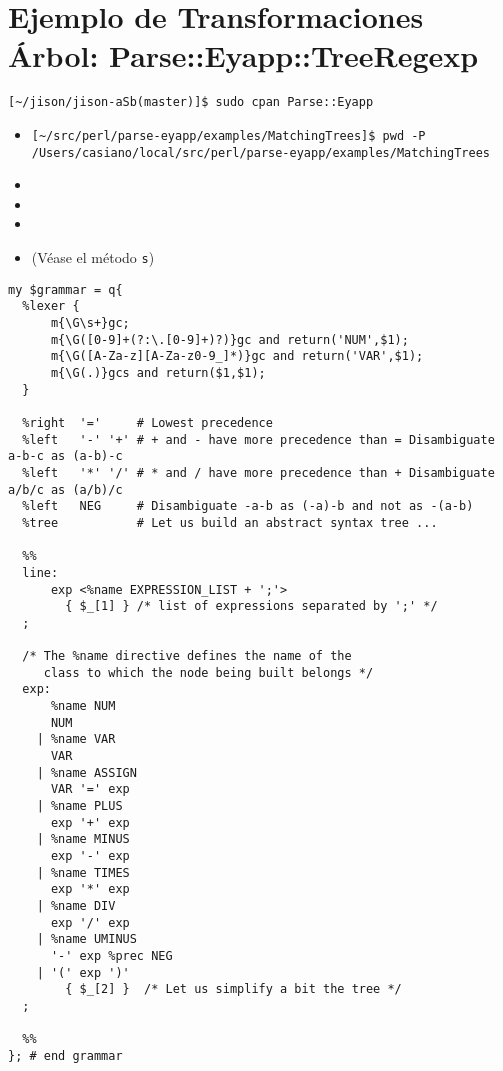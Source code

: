 \section{Ejemplo de Transformaciones Árbol: Parse::Eyapp::TreeRegexp}


\begin{verbatim}
[~/jison/jison-aSb(master)]$ sudo cpan Parse::Eyapp
\end{verbatim}


\begin{itemize}
\item
\begin{verbatim}
[~/src/perl/parse-eyapp/examples/MatchingTrees]$ pwd -P
/Users/casiano/local/src/perl/parse-eyapp/examples/MatchingTrees
\end{verbatim}
\item
{}
\item
{}
\item
{}
\item
{} (Véase el método \verb|s|)
\end{itemize}


\begin{verbatim}
my $grammar = q{
  %lexer {
      m{\G\s+}gc;
      m{\G([0-9]+(?:\.[0-9]+)?)}gc and return('NUM',$1);
      m{\G([A-Za-z][A-Za-z0-9_]*)}gc and return('VAR',$1);
      m{\G(.)}gcs and return($1,$1);
  }

  %right  '='     # Lowest precedence
  %left   '-' '+' # + and - have more precedence than = Disambiguate a-b-c as (a-b)-c
  %left   '*' '/' # * and / have more precedence than + Disambiguate a/b/c as (a/b)/c
  %left   NEG     # Disambiguate -a-b as (-a)-b and not as -(a-b)
  %tree           # Let us build an abstract syntax tree ...

  %%
  line: 
      exp <%name EXPRESSION_LIST + ';'>  
        { $_[1] } /* list of expressions separated by ';' */
  ;

  /* The %name directive defines the name of the
     class to which the node being built belongs */
  exp:
      %name NUM  
      NUM            
    | %name VAR   
      VAR         
    | %name ASSIGN 
      VAR '=' exp 
    | %name PLUS 
      exp '+' exp    
    | %name MINUS 
      exp '-' exp 
    | %name TIMES  
      exp '*' exp 
    | %name DIV     
      exp '/' exp 
    | %name UMINUS 
      '-' exp %prec NEG 
    | '(' exp ')'  
        { $_[2] }  /* Let us simplify a bit the tree */
  ;

  %%
}; # end grammar
\end{verbatim}

